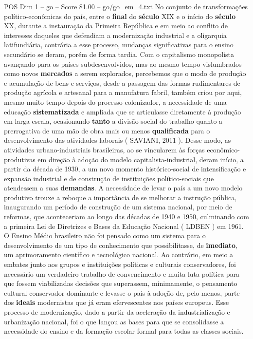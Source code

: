 \begin{textsample}{POS Dim 1 – go – Score 81.00 – go/go\_em\_4.txt}
No conjunto de transformações político-econômicas do país, entre o \textbf{final} do \textbf{século} XIX e o início do \textbf{século} XX, durante a instauração da Primeira República e em meio ao conflito de interesses daqueles que defendiam a modernização industrial e a oligarquia latifundiária, contrária a esse processo, mudanças significativas para o ensino secundário se deram, porém de forma tardia.
Com o capitalismo monopolista avançando para os países subdesenvolvidos, mas ao mesmo tempo vislumbrados como novos \textbf{mercados} a serem explorados, percebemos que o modo de produção e acumulação de bens e serviços, desde a passagem das formas rudimentares de produção agrícola e artesanal para a manufatura fabril, também criou por aqui, mesmo muito tempo depois do processo colonizador, a necessidade de uma educação \textbf{sistematizada} e ampliada que se articulasse diretamente à produção em larga escala, ocasionando \textbf{tanto} a divisão social do trabalho quanto a prerrogativa de uma mão de obra mais ou menos \textbf{qualificada} para o desenvolvimento das atividades laborais ( SAVIANI, 2011 ).
Desse modo, as atividades urbano-industriais brasileiras, ao se vincularem às forças econômico-produtivas em direção à adoção do modelo capitalista-industrial, deram início, a partir da década de 1930, a um novo momento histórico-social de intensificação e expansão industrial e de construção de instituições político-sociais que atendessem a suas \textbf{demandas}.
A necessidade de levar o país a um novo modelo produtivo trouxe a reboque a importância de se melhorar a instrução pública, inaugurando um período de construção de um sistema nacional, por meio de reformas, que aconteceriam ao longo das décadas de 1940 e 1950, culminando com a primeira Lei de Diretrizes e Bases da Educação Nacional ( LDBEN ) em 1961.
O Ensino Médio brasileiro não foi pensado como um sistema para o desenvolvimento de um tipo de conhecimento que possibilitasse, de \textbf{imediato}, um aprimoramento científico e tecnológico nacional.
Ao contrário, em meio a embates junto aos grupos e instituições políticas e culturais conservadores, foi necessário um verdadeiro trabalho de convencimento e muita luta política para que fossem viabilizadas decisões que superassem, minimamente, o pensamento cultural conservador dominante e levasse o país à adoção de, pelo menos, parte dos \textbf{ideais} modernistas que já eram efervescentes nos países europeus.
Esse processo de modernização, dado a partir da aceleração da industrialização e urbanização nacional, foi o que lançou as bases para que se consolidasse a necessidade do ensino e da formação escolar formal para todas as classes sociais.

\end{textsample}
